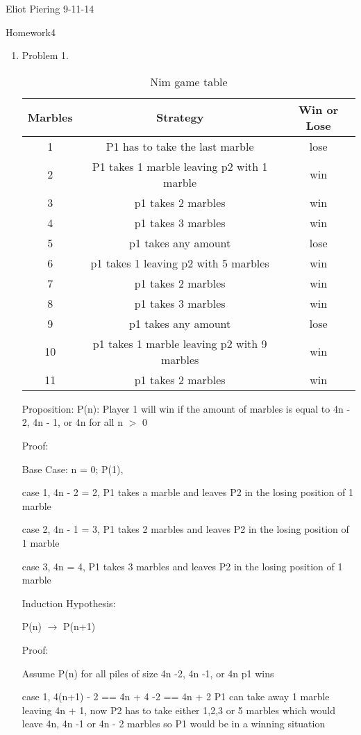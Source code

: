 \documentclass[10pt]{article}
\begin{document}
\hfill Eliot Piering
\hfill 9-11-14

\center Homework4

\begin{enumerate}
\item	Problem 1.

\begin{table}[ht]
\caption{Nim game table}
\centering
\begin{tabular}{c c c}
	Marbles &  Strategy & Win or Lose \\ [0.5ex]
\hline
1 & P1 has to take the last marble & lose \\
2 & P1 takes 1 marble leaving p2 with 1 marble & win \\
3 & p1 takes 2 marbles & win \\
4 & p1 takes 3 marbles & win \\
5 & p1 takes any amount & lose \\
6 & p1 takes 1 leaving p2 with 5 marbles & win \\
7 & p1 takes 2 marbles & win \\
8 & p1 takes 3 marbles & win \\
9 & p1 takes any amount & lose \\
10 & p1 takes 1 marble leaving p2 with 9 marbles & win \\
11 & p1 takes 2 marbles & win \\

\end{tabular}
\end{table}

Proposition: P(n): Player 1 will win if the amount of marbles is equal to 4n - 2, 4n - 1, or 4n for all n $ > $ 0

Proof:

Base Case:  n = 0; P(1),

		case 1, 4n - 2 = 2, P1 takes a marble and leaves P2 in the losing position of 1 marble

		case 2, 4n - 1 = 3, P1 takes 2 marbles and leaves P2 in the losing position of 1 marble

		case 3, 4n = 4, P1 takes 3 marbles and leaves P2 in the losing position of 1 marble

Induction Hypothesis:

	P(n) $ \longrightarrow $ P(n+1)

Proof:

	Assume P(n) for all piles of size 4n -2, 4n -1, or 4n p1 wins

	case 1, 4(n+1) - 2 == 4n + 4 -2 == 4n + 2 P1 can take away 1 marble leaving 4n + 1, now P2 has to take either 1,2,3 or 5 marbles which would leave 4n, 4n -1 or 4n - 2 marbles so P1 would be in a winning situation
	

\end{enumerate}
\end{document}
